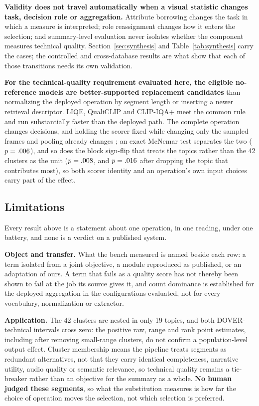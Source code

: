 \textbf{Validity does not travel automatically when a visual statistic changes task, decision role
or aggregation.} Attribute borrowing changes
the task in which a measure is interpreted; role reassignment changes how it enters the
selection; and summary-level evaluation never isolates whether the component measures
technical quality. Section~\ref{sec:synthesis} and Table~\ref{tab:synthesis} carry the
cases; the controlled and cross-database results are what show that each of those
transitions needs its own validation.

\textbf{For the technical-quality requirement evaluated here, the eligible no-reference
models are better-supported replacement candidates} than normalizing the deployed operation
by segment length or inserting a newer retrieval descriptor. LIQE, QualiCLIP and
CLIP-IQA$+$ meet the common rule and run substantially faster than the deployed path. The complete operation changes \casCompleta{} decisions, and holding the scorer fixed
while changing only the sampled frames and pooling already changes \casSoCasamento{}; an exact McNemar test separates the two ($p=.006{}$), and so does the block sign-flip
that treats the \mcnBlocos{} topics rather than the 42 clusters as the unit
($p=.008{}$, and $p=.016{}$ after dropping the topic that contributes most),
so both scorer identity and an operation's own input choices carry part of the effect.

\subsection{Limitations}\label{sec:limits}

Every result above is a statement about one operation, in one reading, under one battery,
and none is a verdict on a published system.

\textbf{Object and transfer.} What the bench measured is named beside each row: a term
isolated from a joint objective, a module reproduced as published, or an adaptation of
ours. A term that fails as a quality score has not thereby been shown to fail at the job
its source gives it, and count dominance is established for the deployed aggregation in the
configurations evaluated, not for every vocabulary, normalization or extractor.

\textbf{Application.} The 42 clusters are nested in only 19 topics, and both
DOVER-technical intervals cross zero: the positive raw, range and rank point estimates,
including after removing small-range clusters, do not confirm a population-level output
effect. Cluster membership means the pipeline treats segments as redundant alternatives,
not that they carry identical completeness, narrative utility, audio quality or semantic
relevance, so technical quality remains a tie-breaker rather than an objective for the summary as a
whole. \textbf{No human judged these segments}, so what the substitution measures is how far the
choice of operation moves the selection, not which selection is preferred.

